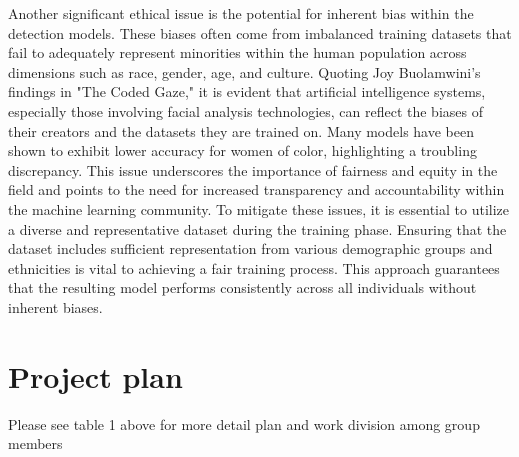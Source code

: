 \documentclass{article} %
\begin{document}
Another significant ethical issue is the potential for inherent bias within the detection models. These biases often come from imbalanced training datasets that fail to adequately represent minorities within the human population across dimensions such as race, gender, age, and culture. Quoting Joy Buolamwini’s findings in "The Coded Gaze," it is evident that artificial intelligence systems, especially those involving facial analysis technologies, can reflect the biases of their creators and the datasets they are trained on. Many models have been shown to exhibit lower accuracy for women of color, highlighting a troubling discrepancy. This issue underscores the importance of fairness and equity in the field and points to the need for increased transparency and accountability within the machine learning community. To mitigate these issues, it is essential to utilize a diverse and representative dataset during the training phase. Ensuring that the dataset includes sufficient representation from various demographic groups and ethnicities is vital to achieving a fair training process. This approach guarantees that the resulting model performs consistently across all individuals without inherent biases.


\section{Project plan }
Please see table 1 above for more detail plan and work division among group members
\end{document}
